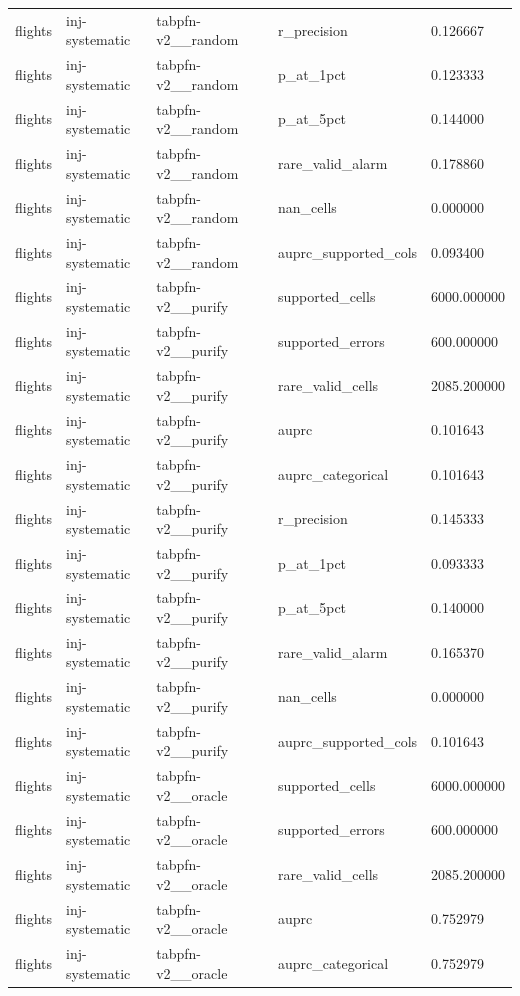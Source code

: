 \begin{tabular}{lllll}
flights & inj-systematic & tabpfn-v2\_\_random & r\_precision & 0.126667 \\
flights & inj-systematic & tabpfn-v2\_\_random & p\_at\_1pct & 0.123333 \\
flights & inj-systematic & tabpfn-v2\_\_random & p\_at\_5pct & 0.144000 \\
flights & inj-systematic & tabpfn-v2\_\_random & rare\_valid\_alarm & 0.178860 \\
flights & inj-systematic & tabpfn-v2\_\_random & nan\_cells & 0.000000 \\
flights & inj-systematic & tabpfn-v2\_\_random & auprc\_supported\_cols & 0.093400 \\
flights & inj-systematic & tabpfn-v2\_\_purify & supported\_cells & 6000.000000 \\
flights & inj-systematic & tabpfn-v2\_\_purify & supported\_errors & 600.000000 \\
flights & inj-systematic & tabpfn-v2\_\_purify & rare\_valid\_cells & 2085.200000 \\
flights & inj-systematic & tabpfn-v2\_\_purify & auprc & 0.101643 \\
flights & inj-systematic & tabpfn-v2\_\_purify & auprc\_categorical & 0.101643 \\
flights & inj-systematic & tabpfn-v2\_\_purify & r\_precision & 0.145333 \\
flights & inj-systematic & tabpfn-v2\_\_purify & p\_at\_1pct & 0.093333 \\
flights & inj-systematic & tabpfn-v2\_\_purify & p\_at\_5pct & 0.140000 \\
flights & inj-systematic & tabpfn-v2\_\_purify & rare\_valid\_alarm & 0.165370 \\
flights & inj-systematic & tabpfn-v2\_\_purify & nan\_cells & 0.000000 \\
flights & inj-systematic & tabpfn-v2\_\_purify & auprc\_supported\_cols & 0.101643 \\
flights & inj-systematic & tabpfn-v2\_\_oracle & supported\_cells & 6000.000000 \\
flights & inj-systematic & tabpfn-v2\_\_oracle & supported\_errors & 600.000000 \\
flights & inj-systematic & tabpfn-v2\_\_oracle & rare\_valid\_cells & 2085.200000 \\
flights & inj-systematic & tabpfn-v2\_\_oracle & auprc & 0.752979 \\
flights & inj-systematic & tabpfn-v2\_\_oracle & auprc\_categorical & 0.752979 \\

\end{tabular}
